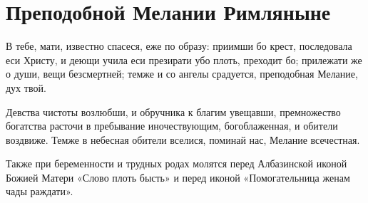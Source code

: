 \section{Преподобной Мелании Римляныне}\begin{mymulticols}



В тебе, мати, известно спасеся, еже по образу: приимши бо крест, последовала еси Христу, и деющи учила еси презирати убо плоть, преходит бо; прилежати же о души, вещи безсмертней; темже и со ангелы срадуется, преподобная Мелание, дух твой.




Девства чистоты возлюбши, и обручника к благим увещавши, премножество богатства расточи в пребывание иночествующим, богоблаженная, и обители воздвиже. Темже в небесная обители вселися, поминай нас, Мелание всечестная.

Также при беременности и трудных родах молятся перед Албазинской иконой Божией Матери «Слово плоть бысть» и перед иконой «Помогательница женам чады раждати».

\end{mymulticols}

